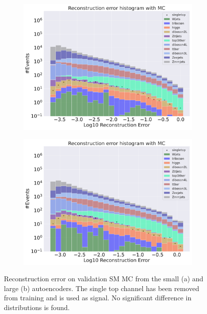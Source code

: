 \begin{figure}[!htb]
    \centering
    \begin{subfigure}{.45\textwidth}
        \includegraphics[width=\textwidth]{Figures/AE_testing/small/b_data_recon_big_rm3_feats_sig_singletop.pdf}
        \caption{}
        \label{fig:ae_small_singletop}
    \end{subfigure}
    \hfill
    \begin{subfigure}{.45\textwidth}
        \includegraphics[width=\textwidth]{Figures/AE_testing/big/b_data_recon_big_rm3_feats_sig_singletop.pdf}
        \caption{ }
        \label{fig:ae_big_singletop}
    \end{subfigure}
    \hfill
    \caption[AE | Reconstruction error using Singletop channel as signal]{Reconstruction error on validation SM MC from the small (a) and large (b) autoencoders. The single top channel has been removed from training and 
    is used as signal. No significant difference in distributions is found.  } 
    \label{fig:ae_big_channel_2}
\end{figure}

